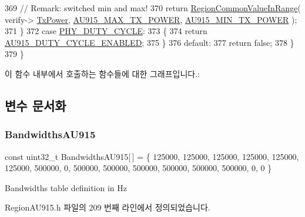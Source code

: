 \begin{DoxyCode}
369             \textcolor{comment}{// Remark: switched min and max!}
370             \textcolor{keywordflow}{return} \mbox{\hyperlink{group___r_e_g_i_o_n_c_o_m_m_o_n_gafdd1c80d953e18d755a631b72a9c3bd3}{RegionCommonValueInRange}}( verify->
      \mbox{\hyperlink{unionu_verify_params_a037b4f849fa8ed4aa1d3c58aef2b28ec}{TxPower}}, \mbox{\hyperlink{group___r_e_g_i_o_n_a_u915_ga36808f695e52582b8a6a3ca4b4bf61d4}{AU915\_MAX\_TX\_POWER}}, \mbox{\hyperlink{group___r_e_g_i_o_n_a_u915_gabd0f5ea8e2143d42b1e480305bb2fd5d}{AU915\_MIN\_TX\_POWER}} );
371         \}
372         \textcolor{keywordflow}{case} \mbox{\hyperlink{group___r_e_g_i_o_n_gga51cbe8f5433d914fe9cf81b451de2c2dac66308571e624ecc28c79ee0deab8cf0}{PHY\_DUTY\_CYCLE}}:
373         \{
374             \textcolor{keywordflow}{return} \mbox{\hyperlink{group___r_e_g_i_o_n_a_u915_gad79bd0bbe937761936fef981e384d398}{AU915\_DUTY\_CYCLE\_ENABLED}};
375         \}
376         \textcolor{keywordflow}{default}:
377             \textcolor{keywordflow}{return} \textcolor{keyword}{false};
378     \}
379 \}
\end{DoxyCode}
이 함수 내부에서 호출하는 함수들에 대한 그래프입니다.\+:


\subsection{변수 문서화}
\mbox{\label{group___r_e_g_i_o_n_a_u915_ga02efc5a531fde19a519564cc39dd9bff}} 
\subsubsection{\texorpdfstring{Bandwidths\+A\+U915}{BandwidthsAU915}}
{\footnotesize\ttfamily const uint32\+\_\+t Bandwidths\+A\+U915\mbox{[}$\,$\mbox{]} = \{ 125000, 125000, 125000, 125000, 125000, 125000, 500000, 0, 500000, 500000, 500000, 500000, 500000, 500000, 0, 0 \}\hspace{0.3cm}{\ttfamily [static]}}

Bandwidths table definition in Hz 

Region\+A\+U915.\+h 파일의 209 번째 라인에서 정의되었습니다.

\mbox{\label{group___r_e_g_i_o_n_a_u915_ga21954b1aad2914192201787f60b2203b}} 
